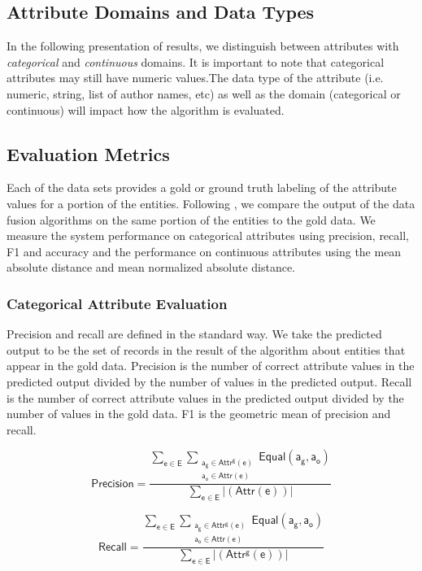 \documentclass{acm_proc_article-sp}
\begin{document}
\subsection{Attribute Domains and Data Types}

In the following presentation of results, we distinguish between attributes with  \emph{categorical} and \emph{continuous} domains. It is important to note that categorical attributes may still have numeric values.The data type of the attribute (i.e. numeric, string, list of author names, etc) as well as the domain (categorical or continuous) will impact how the algorithm is evaluated. 

\subsection{Evaluation Metrics}

Each of the data sets provides a gold or ground truth labeling of the attribute values for a portion of the entities. Following \cite{li:truth,li:resolving,waguih:truth,dong:integrating}, we compare the output of the data fusion algorithms on the same portion of the entities to the gold data. We measure the system performance on categorical attributes using precision, recall, F1 and accuracy and the performance on continuous attributes using  the mean absolute distance and mean normalized absolute distance. 

\subsubsection{Categorical Attribute Evaluation}

Precision and recall are defined in the standard way. We take the predicted output to be the set of records in the result of the algorithm about entities  that appear in the gold data. Precision is the number of correct attribute values in the predicted output divided by the number of values in the predicted output. Recall is the number of correct attribute values in the predicted output divided by the number of values in the gold data. F1 is the geometric mean of precision and recall. 


\begin{equation}
\mathsf {Precision =\frac {\sum_{e \in E}  \sum_{\substack{a_g \in Attr^g(e) \\ a_o \in Attr(e)}} \mathsf{Equal}(a_g,a_o)}{\sum_{e \in E}  |(Attr(e))| }}
\end{equation}


 \begin{equation}
\mathsf {Recall =\frac {\sum_{e \in E}  \sum_{\substack{a_g \in Attr^g(e) \\ a_o \in Attr(e)}} \mathsf{Equal}(a_g,a_o)} {\sum_{e \in E}  |(Attr^g(e))| }}
\end{equation}
\end{document}
